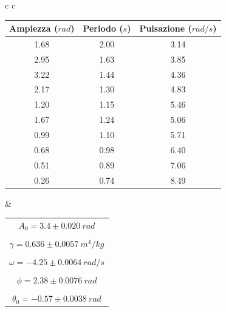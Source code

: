 \begin{center}

\begin{tabular}{c c}

\begin{tabular}{c | c | c}
\textbf{Ampiezza} ($rad$) & \textbf{Periodo} ($s$) & \textbf{Pulsazione} ($rad/s$)\\
\midrule
1.68 & 2.00 & 3.14\\
2.95 & 1.63 & 3.85\\
3.22 & 1.44 & 4.36\\
2.17 & 1.30 & 4.83\\
1.20 & 1.15 & 5.46\\
1.67 & 1.24 & 5.06\\
0.99 & 1.10 & 5.71\\
0.68 & 0.98 & 6.40\\
0.51 & 0.89 & 7.06\\
0.26 & 0.74 & 8.49\\
\end{tabular}

& \hspace{1cm}

\begin{tabular}{c}
$A_0 = 3.4 \pm 0.020\ rad$\\
\\
$\gamma =  0.636 \pm 0.0057\ m^4/kg $\\
\\
$\omega = -4.25  \pm 0.0064\ rad/s $\\
\\
$\phi =  2.38 \pm 0.0076\ rad $ \\
\\
$\theta_0 = -0.57 \pm 0.0038\ rad $\\

\end{tabular}

\end{tabular}

\end{center}

